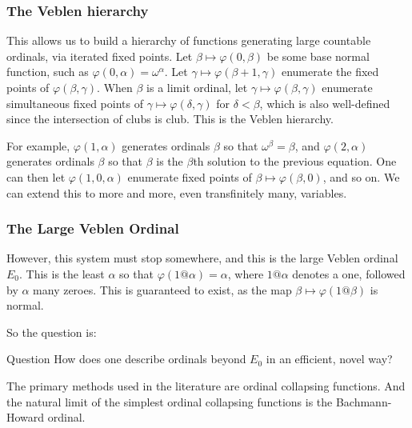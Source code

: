 \documentclass{beamer}
\begin{document}
\begin{frame}
\frametitle{The Veblen hierarchy}

This allows us to build a hierarchy of functions generating large countable ordinals, via iterated fixed points. Let $\beta \mapsto \varphi(0,\beta)$ be some base normal function, such as $\varphi(0,\alpha) = \omega^\alpha$. \pause Let $\gamma \mapsto \varphi(\beta+1,\gamma)$ enumerate the fixed points of $\varphi(\beta,\gamma)$. \pause When $\beta$ is a limit ordinal, let $\gamma \mapsto \varphi(\beta,\gamma)$ enumerate simultaneous fixed points of $\gamma \mapsto \varphi(\delta,\gamma)$ for $\delta < \beta$, which is also well-defined since the intersection of clubs is club. This is the Veblen hierarchy.

\pause

For example, $\varphi(1,\alpha)$ generates ordinals $\beta$ so that $\omega^\beta = \beta$, and $\varphi(2,\alpha)$ generates ordinals $\beta$ so that $\beta$ is the $\beta$th solution to the previous equation. One can then let $\varphi(1,0,\alpha)$ enumerate fixed points of $\beta \mapsto \varphi(\beta, 0)$, and so on. We can extend this to more and more, even transfinitely many, variables.
\end{frame}

\begin{frame}
\frametitle{The Large Veblen Ordinal}
However, this system must stop somewhere, and this is the large Veblen ordinal $E_0$. This is the least $\alpha$ so that $\varphi(1@\alpha) = \alpha$, where $1@\alpha$ denotes a one, followed by $\alpha$ many zeroes. This is guaranteed to exist, as the map $\beta \mapsto \varphi(1@\beta)$ is normal.

\pause

So the question is:

\begin{block}{Question}
How does one describe ordinals beyond $E_0$ in an efficient, novel way?
\end{block}

\pause

The primary methods used in the literature are \alert{ordinal collapsing functions}. And the natural limit of the simplest ordinal collapsing functions is the Bachmann-Howard ordinal.
\end{frame}
\end{document}
